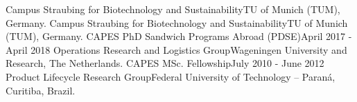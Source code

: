 %
%
%


\begin{projects}
	{Campus Straubing for Biotechnology and Sustainability}{TU of Munich (TUM), Germany.} 
	{Campus Straubing for Biotechnology and Sustainability}{TU of Munich (TUM), Germany.} 
	\smallproject
	{CAPES PhD Sandwich Programs Abroad (PDSE)}{April 2017 - April 2018}
	{Operations Research and Logistics Group}{Wageningen University and Research, The Netherlands.} 
	\smallproject
	{CAPES MSc. Fellowship}{July 2010 - June 2012}
    	{Product Lifecycle Research Group}{Federal University of Technology – Paraná, Curitiba, Brazil.} 
\end{projects}